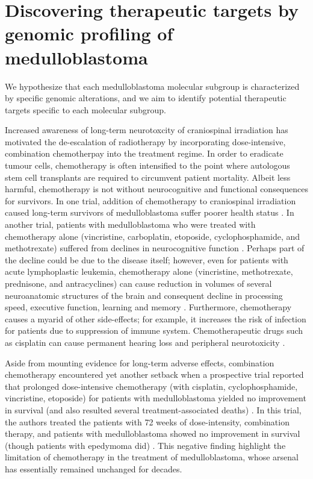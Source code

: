 \chapter{Discovering therapeutic targets by genomic profiling of medulloblastoma}
\label{ch:target-id}

\begin{objective}
We hypothesize that each medulloblastoma molecular subgroup is characterized by specific genomic alterations, and we aim to identify potential therapeutic targets specific to each molecular subgroup.
\end{objective}

Increased awareness of long-term neurotoxcity of craniospinal irradiation has motivated the de-escalation of radiotherapy by incorporating dose-intensive, combination chemotherpay into the treatment regime. In order to eradicate tumour cells, chemotherapy is often intensified to the point where autologous stem cell transplants are required to circumvent patient mortality. Albeit less harmful, chemotherapy is not without neurocognitive and functional consequences for survivors. In one trial, addition of chemotherapy to craniospinal irradiation caused long-term survivors of medulloblastoma suffer poorer health status . In another trial, patients with medulloblastoma who were treated with chemotherapy alone (vincristine, carboplatin, etoposide, cyclophosphamide, and methotrexate) suffered from declines in neurocognitive function . Perhaps part of the decline could be due to the disease itself; however, even for patients with acute lymphoplastic leukemia, chemotherapy alone (vincristine, methotrexate, prednisone, and antracyclines) can cause reduction in volumes of several neuroanatomic structures of the brain and consequent decline in processing speed, executive function, learning and memory . Furthermore, chemotherapy causes a myarid of other side-effects; for example, it increases the risk of infection for patients due to suppression of immune system. Chemotherapeutic drugs such as cisplatin can cause permanent hearing loss and peripheral neurotoxicity .

Aside from mounting evidence for long-term adverse effects, combination chemotherapy encountered yet another setback when a prospective trial reported that prolonged dose-intensive chemotherapy (with cisplatin, cyclophosphamide, vincristine, etoposide) for patients with medulloblastoma yielded no improvement in survival (and also resulted several treatment-associated deaths) . In this trial, the authors treated the patients with 72 weeks of dose-intensity, combination therapy, and patients with medulloblastoma showed no improvement in survival (though patients with epedymoma did) . This negative finding highlight the limitation of chemotherapy in the treatment of medulloblastoma, whose arsenal has essentially remained unchanged for decades.

